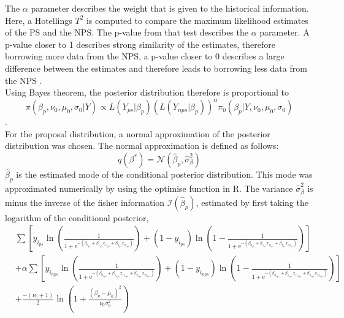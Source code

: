\documentclass[10.5pt]{article}
\begin{document}
The \(\alpha\) parameter describes the weight that is given to the historical information. Here, a Hotellings \(T^2\) is computed to compare the maximum likelihood estimates of the PS and the NPS. The p-value from that test describes the \(\alpha\) parameter. A p-value closer to 1 describes strong similarity of the estimates, therefore borrowing more data from the NPS, a p-value closer to 0 describes a large difference between the estimates and therefore leads to borrowing less data from the NPS \citep{salvatore2024bayesian}. \\
Using Bayes theorem, the posterior distribution therefore is proportional to
\begin{equation}
    \pi(\beta_p, \nu_0, \mu_0, \sigma_0|Y) \propto L(Y_{ps}|\beta_p)(L(Y_{nps}|\beta_p))^{\alpha}\pi_0(\beta_p|Y, \nu_0, \mu_0, \sigma_0)
\end{equation}
. \\
For the proposal distribution, a normal approximation of the posterior distribution was chosen. The normal approximation is defined as follows:
\begin{equation}
    q(\beta^*) = \mathcal{N}(\hat{\beta}_p, \hat{\sigma}_{\beta}^2) 
\end{equation}
\( \hat{\beta}_p \) is the estimated mode of the conditional posterior distribution. This mode was approximated numerically by using the optimise function in R. The variance \(\hat{\sigma}_{\beta}^2\) is minus the inverse of the fisher information \( \mathcal{I}(\hat{\beta}_p) \), estimated by first taking the logarithm of the conditional posterior,
\begin{equation}
    \begin{split}
        &\sum \left[ y_{i_{ps}} \ln \left( \frac{1}{1+\mathrm{e}^{-(\beta_{0_{ps}} + \beta_{1_{ps}} x_{1i_{ps}} + \beta_{2_{ps}} x_{2i_{ps}})}} \right) 
        + (1-y_{i_{ps}}) \ln \left( 1 - \frac{1}{1+\mathrm{e}^{-(\beta_{0_{ps}} + \beta_{1_{ps}} x_{1i_{ps}} + \beta_{2_{ps}} x_{2i_{ps}})}} \right) \right] \\
        &+\alpha \sum \left[ y_{i_{nps}} \ln \left( \frac{1}{1+\mathrm{e}^{-(\beta_{0_{nps}} + \beta_{1_{nps}} x_{1i_{nps}} + \beta_{2_{nps}} x_{2i_{nps}})}} \right) 
        + (1-y_{i_{nps}}) \ln \left( 1 - \frac{1}{1+\mathrm{e}^{-(\beta_{0_{nps}} + \beta_{1_{nps}} x_{1i_{nps}} + \beta_{2_{nps}} x_{2i_{nps}})}} \right) \right] \\
        &+ \frac{-(\nu_0+1)}{2} \ln \left( 1 + \frac{(\beta_p - \mu_0)^2}{\nu_0 \sigma_0^2} \right)
    \end{split}
\end{equation}
\end{document}
